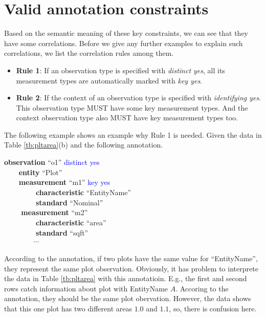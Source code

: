 \documentclass[10pt]{article}
\begin{document}
\section{Valid annotation constraints}

Based on the semantic meaning of these key constraints, we can see
that they have some correlations. 
Before we give any further examples to explain such correlations, we
list the correlation rules among them.

\begin{itemize}
\item {\bf Rule 1}: If an observation type is specified with {\em distinct yes}, all
  its measurement types are automatically marked with {\em key yes}. 
\item {\bf Rule 2}: If the context of an observation type is specified with {\em identifying
    yes}. This observation type MUST have some key measurement
  types. And the context observation type also MUST have key
  measurement types too. 
\end{itemize} 

The following example shows an example why Rule 1 is needed. 
Given the data in Table \ref{tb:pltarea}(b) and the following
annotation. 

\noindent
{\bf observation} ``o1''  \textcolor{blue}{distinct yes}\\
\verb|    |{\bf  entity} ``Plot''\\
\verb|    |{\bf measurement} ``m1'' \textcolor{blue}{key yes}\\
\verb|        | {\bf characteristic} ``EntityName'' \\
\verb|        | {\bf standard} ``Nominal''\\
\verb|    | {\bf measurement} ``m2''\\
\verb|        | {\bf characteristic} ``area'' \\
\verb|        | {\bf standard} ``sqft''\\
\verb|        |$\cdots$ 

According to the annotation, if two plots have the same value for
``EntityName'', they represent the same plot observation. 
Obviously, it has problem to interprete the data in Table
\ref{tb:pltarea} with this annotatioin. 
E.g., the first and second rows catch information about plot with
EntityName $A$. Accoring to the annotation, they should be the same
plot obervation. 
However, the data shows that this one plot has two different areas
$1.0$ and $1.1$, so, there is confusion here.
\end{document}
